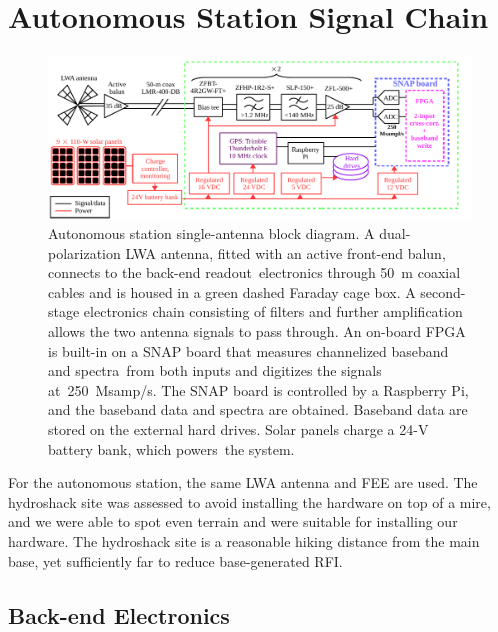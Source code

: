 \section{Autonomous Station Signal Chain}

\begin{figure}
	\begin{center}
		\includegraphics[width=\linewidth]{Figures/albatros_single_schematic}
		\caption{Autonomous station single-antenna block diagram. A dual-polarization LWA antenna, fitted with an active front-end balun, connects to the back-end readout electronics through \SI{50}{\meter} coaxial cables and is housed in a green dashed Faraday cage box. A second-stage electronics chain consisting of filters and further amplification allows the two antenna signals to pass through. An on-board FPGA is built-in on a SNAP board that measures channelized baseband and spectra from both inputs and digitizes the signals at 250~Msamp/s. The SNAP board is controlled by a Raspberry Pi, and the baseband data and spectra are obtained. Baseband data are stored on the external hard drives. Solar panels charge a 24-V battery bank, which powers the system.}
		\label{Fig:albatros1_schem}
	\end{center}
\end{figure}

For the autonomous station, the same LWA antenna and FEE are used. The hydroshack site was assessed to avoid installing the hardware on top of a mire, and we were able to spot even terrain and were suitable for installing our hardware. The hydroshack site is a reasonable hiking distance from the main base, yet sufficiently far to reduce base-generated RFI.

\subsection{Back-end Electronics} 

